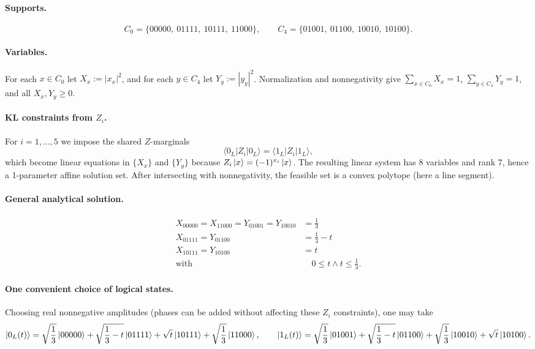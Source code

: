 \documentclass[11pt]{article}
\begin{document}
\paragraph{Supports.}
\[
C_0 = \{00000,\ 01111,\ 10111,\ 11000\},\qquad C_4 = \{01001,\ 01100,\ 10010,\ 10100\}.
\]

\paragraph{Variables.}
For each $x\in C_0$ let $X_x:=|x_x|^2$, and for each $y\in C_4$ let $Y_y:=|y_y|^2$.
Normalization and nonnegativity give $\sum_{x\in C_0}X_x=1$, $\sum_{y\in C_4}Y_y=1$, and all $X_x,Y_y\ge 0$.

\paragraph{KL constraints from $Z_i$.}
For $i=1,\dots,5$ we impose the shared $Z$-marginals
\[
\langle 0_L|Z_i|0_L\rangle=\langle 1_L|Z_i|1_L\rangle,
\]
which become linear equations in $\{X_x\}$ and $\{Y_y\}$ because $Z_i\ket{x}=(-1)^{x_i}\ket{x}$.
The resulting linear system has 8 variables and rank 7, hence a 1-parameter affine solution set. After intersecting with nonnegativity, the feasible set is a convex polytope (here a line segment).

\paragraph{General analytical solution.}
\[
\begin{aligned}
X_{00000} = X_{11000} = Y_{01001} = Y_{10010} &= \frac{1}{3}\\
X_{01111} = Y_{01100} &= \frac{1}{3} - t\\
X_{10111} = Y_{10100} &= t\\
\text{with }&\quad 0 \leq t \wedge t \leq \frac{1}{3}.
\end{aligned}
\]
\paragraph{One convenient choice of logical states.}
Choosing real nonnegative amplitudes (phases can be added without affecting these $Z_i$ constraints), one may take
\[
\ket{0_L(t)} = \sqrt{\frac{1}{3}}\ket{00000} + \sqrt{\frac{1}{3} - t}\ket{01111} + \sqrt{t}\ket{10111} + \sqrt{\frac{1}{3}}\ket{11000},\qquad \ket{1_L(t)} = \sqrt{\frac{1}{3}}\ket{01001} + \sqrt{\frac{1}{3} - t}\ket{01100} + \sqrt{\frac{1}{3}}\ket{10010} + \sqrt{t}\ket{10100}.
\]
\end{document}
